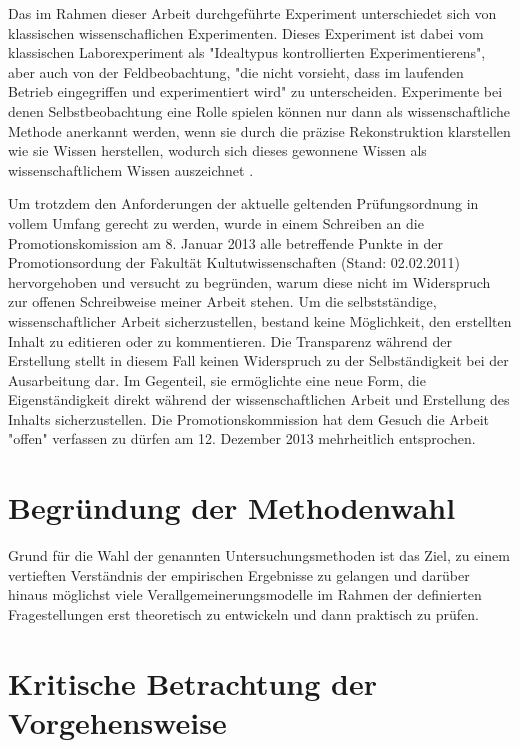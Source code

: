 Das im Rahmen dieser Arbeit durchgeführte Experiment unterschiedet sich von klassischen wissenschaflichen Experimenten. Dieses Experiment ist dabei vom klassischen Laborexperiment als "Idealtypus kontrollierten Experimentierens", aber auch von der Feldbeobachtung, "die nicht vorsieht, dass im laufenden Betrieb eingegriffen und experimentiert wird" \cite{FQS196} zu unterscheiden. Experimente bei denen Selbstbeobachtung eine Rolle spielen können nur dann als wissenschaftliche Methode anerkannt werden, wenn sie durch die präzise Rekonstruktion klarstellen wie sie Wissen herstellen, wodurch sich dieses gewonnene Wissen als wissenschaftlichem Wissen auszeichnet \cite{solhdju_2011_selbstexperimente}. 

Um trotzdem den Anforderungen der aktuelle geltenden Prüfungsordnung in vollem Umfang gerecht zu werden, wurde in einem Schreiben an die Promotionskomission am 8. Januar 2013 alle betreffende Punkte in der Promotionsordung der Fakultät Kultutwissenschaften (Stand: 02.02.2011) hervorgehoben und versucht zu begründen, warum diese nicht im Widerspruch zur offenen Schreibweise meiner Arbeit stehen. Um die selbstständige, wissenschaftlicher Arbeit sicherzustellen, bestand keine Möglichkeit, den erstellten Inhalt zu editieren oder zu kommentieren. Die Transparenz während der Erstellung stellt in diesem Fall keinen Widerspruch zu der Selbständigkeit bei der Ausarbeitung dar. Im Gegenteil, sie ermöglichte eine neue Form, die Eigenständigkeit direkt während der wissenschaftlichen Arbeit und Erstellung des Inhalts sicherzustellen. Die Promotionskommission hat dem Gesuch die Arbeit "offen" verfassen zu dürfen am 12. Dezember 2013 mehrheitlich entsprochen.

\section{Begründung der Methodenwahl} 

Grund für die Wahl der genannten Untersuchungsmethoden ist das Ziel, zu einem vertieften Verständnis der empirischen Ergebnisse zu gelangen und darüber hinaus möglichst viele Verallgemeinerungsmodelle im Rahmen der definierten Fragestellungen erst theoretisch zu entwickeln und dann praktisch zu prüfen.

\section{Kritische Betrachtung der Vorgehensweise} 
